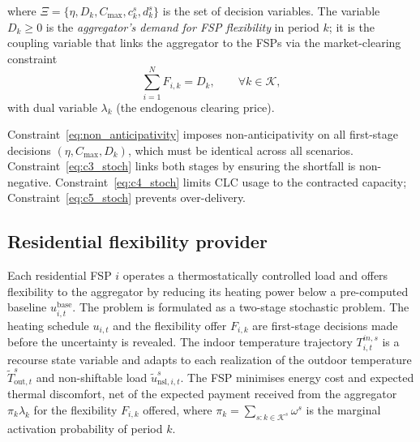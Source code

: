 where $\Xi = \{\eta, D_k, C_{\max}, c^s_k, d^s_k\}$ is the set of decision variables. The variable $D_k \geq 0$ is the \emph{aggregator's demand for FSP flexibility} in period $k$; it is the coupling variable that links the aggregator to the FSPs via the market-clearing constraint
\begin{equation}
\label{eq:market_clearing}
  \sum_{i=1}^{N} F_{i,k} = D_k, \qquad \forall k \in \mathcal{K},
\end{equation}
with dual variable $\lambda_k$ (the endogenous clearing price).

Constraint~\eqref{eq:non_anticipativity} imposes non-anticipativity on all first-stage decisions $(\eta, C_{\max}, D_k)$, which must be identical across all scenarios. Constraint~\eqref{eq:c3_stoch} links both stages by ensuring the shortfall is non-negative. Constraint~\eqref{eq:c4_stoch} limits CLC usage to the contracted capacity; Constraint~\eqref{eq:c5_stoch} prevents over-delivery.

\subsection{Residential flexibility provider}

Each residential FSP $i$ operates a thermostatically controlled load and offers flexibility to the aggregator by reducing its heating power below a pre-computed baseline $u_{i,t}^{\text{base}}$. The problem is formulated as a two-stage stochastic problem. The heating schedule $u_{i,t}$ and the flexibility offer $F_{i,k}$ are first-stage decisions made before the uncertainty is revealed. The indoor temperature trajectory $T^{in,s}_{i,t}$ is a recourse state variable and adapts to each realization of the outdoor temperature $\tilde{T}_{\text{out},t}^s$ and non-shiftable load $\tilde{u}_{\text{nsl},i,t}^s$. The FSP minimises energy cost and expected thermal discomfort, net of the expected payment received from the aggregator $\pi_k \lambda_k$ for the flexibility $F_{i,k}$ offered, where $\pi_k = \sum_{s: k \in \mathcal{K}^s} \omega^s$ is the marginal activation probability of period $k$.

